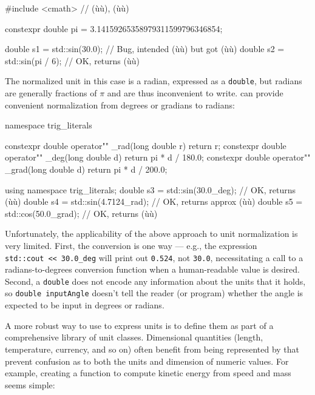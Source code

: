 \begin{emcppslisting}[emcppsbatch=e19]
#include <cmath>  // (ù{}ù), (ù{}ù)

constexpr double pi = 3.14159265358979311599796346854;

double s1 = std::sin(30.0);    // Bug, intended (ù{}ù) but got (ù{}ù)
double s2 = std::sin(pi / 6);  // OK, returns (ù{}ù)
\end{emcppslisting}

\noindent The normalized unit in this case is a radian, expressed as a
\lstinline!double!, but radians are generally fractions of $\pi$ and are thus
inconvenient to write.  can provide convenient
normalization from degrees or gradians to radians:

\begin{emcppslisting}[emcppsbatch=e19]
namespace trig_literals {

constexpr double operator"" _rad(long double r)  { return r; }
constexpr double operator"" _deg(long double d)  { return pi * d / 180.0; }
constexpr double operator"" _grad(long double d) { return pi * d / 200.0; }

}

using namespace trig_literals;
double s3 = std::sin(30.0_deg);     // OK, returns (ù{}ù)
double s4 = std::sin(4.7124_rad);   // OK, returns approx (ù{}ù)
double s5 = std::cos(50.0_grad);    // OK, returns (ù{}ù)
\end{emcppslisting}

\noindent Unfortunately, the applicability of the above approach to unit normalization
is very limited. First, the conversion is one way --- e.g., the
expression \lstinline!std::cout!~\lstinline!<<!~\lstinline!30.0_deg! will print
out \lstinline!0.524!, not \lstinline!30.0!, necessitating a call to a
radians-to-degrees conversion function when a human-readable value is
desired. Second, a \lstinline!double! does not encode any information about
the units that it holds, so \lstinline!double!~\lstinline!inputAngle! doesn't
tell the reader (or program) whether the angle is expected to be input
in degrees or radians.

A more robust way to use  to express units is to
define them as part of a comprehensive library of unit classes.
Dimensional quantities (length, temperature, currency, and so on) often
benefit from being represented by  that
prevent confusion as to both the units and dimension of numeric values.
For example, creating a function to compute kinetic energy from speed
and mass seems simple:

